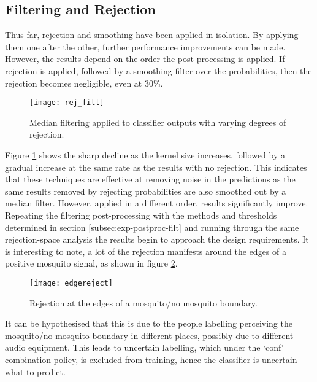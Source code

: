     \subsection{Filtering and Rejection}
    \label{subsec:exp-postproc-filtrej}
        Thus far, rejection and smoothing have been applied in isolation. By applying them one after the other, further performance improvements can be made. However, the results depend on the order the post-processing is applied. If rejection is applied, followed by a smoothing filter over the probabilities, then the rejection becomes negligible, even at 30\%. 
        \begin{figure}[ht]
            \centering
            \texttt{[image: rej\_filt]}
            \caption{Median filtering applied to classifier outputs with varying degrees of rejection.}
            \label{fig:exp-postproc-rejfilt}
        \end{figure}
        Figure \ref{fig:exp-postproc-rejfilt} shows the sharp decline as the kernel size increases, followed by a gradual increase at the same rate as the results with no rejection. This indicates that these techniques are effective at removing noise in the predictions as the same results removed by rejecting probabilities are also smoothed out by a median filter. However, applied in a different order, results significantly improve. Repeating the filtering post-processing with the methods and thresholds determined in section \ref{subsec:exp-postproc-filt} and running through the same rejection-space analysis the results begin to approach the design requirements. It is interesting to note, a lot of the rejection manifests around the edges of a positive mosquito signal, as shown in figure \ref{fig:exp-postproc-rejfilt-edge}. 
        \begin{figure}[ht]
            \centering
            \texttt{[image: edgereject]}
            \caption{Rejection at the edges of a mosquito/no mosquito boundary.}
            \label{fig:exp-postproc-rejfilt-edge}
        \end{figure}
        It can be hypothesised that this is due to the people labelling perceiving the mosquito/no mosquito boundary in different places, possibly due to different audio equipment. This leads to uncertain labelling, which under the `conf' combination policy, is excluded from training, hence the classifier is uncertain what to predict.